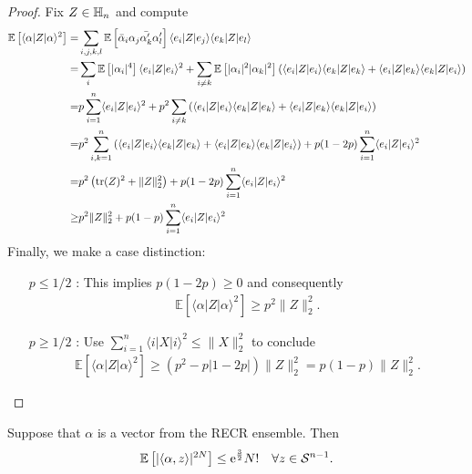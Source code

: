 \begin{proof}
Fix $ Z \in \mathbb{H}_n$ and compute
\begin{align}
  \mathbb{E} \left[ \langle \alpha |  Z | \alpha \rangle^2 \right]
  =& \sum_{i,j,k,l} \mathbb{E} \left[ \bar{\alpha}_i \alpha_j \bar{\alpha^\prime_k} \alpha^\prime_l \right] \langle  e_i| Z|  e_j \rangle \langle  e_k | Z|  e_l \rangle \\
  =& \sum_{i} \mathbb{E} \left[ | \alpha_i |^4 \right] \langle  e_i| Z| e_i \rangle^2 + \sum_{i \neq k} \mathbb{E} \left[ | \alpha_i |^2 | \alpha_k|^2 \right] \left( \langle  e_i| Z| e_i \rangle \langle  e_k| Z| e_k \rangle + \langle  e_i| Z| e_k \rangle \langle  e_k|  Z| e_i \rangle \right) \\
  =& p \sum_{i=1}^n \langle  e_i| Z| e_i \rangle^2 + p^2 \sum_{i \neq k} \left( \langle  e_i| Z| e_i \rangle \langle  e_k| Z| e_k \rangle + \langle  e_i| Z| e_k \rangle \langle  e_k | Z|  e_i\rangle \right) \\
  =& p^2 \sum_{i,k=1}^n \left( \langle  e_i| Z| e_i \rangle \langle  e_k| Z| e_k \rangle + \langle  e_i| Z| e_k \rangle \langle  e_k | Z|  e_i\rangle \right) + p(1-2 p) \sum_{i=1}^n \langle  e_i| Z| e_i \rangle^2 \\
  =& p^2 \left( \operatorname{tr} ( Z)^2 + \| Z\|_2^2 \right) + p (1-2 p) \sum_{i=1}^n \langle  e_i|  Z |  e_i \rangle^2 \\
  \geq& p^2 \| Z\|_2^2 + p(1-p) \sum_{i=1}^n \langle  e_i | Z| e_i \rangle^2
\end{align}
Finally, we make a case distinction:
\begin{itemize}
\item[$p \leq 1/2$]: This implies $p(1-2p) \geq 0$ and consequently
\begin{align}
  \mathbb{E} \left[ \langle \alpha | Z| \alpha \rangle^2 \right] \geq p^2 \|  Z \|_2^2.
\end{align}
\item[$p \geq 1/2$]: Use $\sum_{i=1}^n \langle i| X|i \rangle^2 \leq \| X \|_2^2$ to conclude
\begin{align}
  \mathbb{E} \left[ \langle \alpha |  Z | \alpha \rangle^2 \right]
\geq ( p^2 - p|1-2p|) \| Z\|_2^2 = p(1-p) \|  Z \|_2^2.
\end{align}
\end{itemize}
\end{proof}

\begin{lemma}
Suppose that $\alpha$ is a vector from the RECR ensemble. Then
\begin{align}
\mathbb{E} \left[ | \langle \alpha,  z \rangle|^{2N} \right] \leq \mathrm{e}^{\frac{3}{2}} N! \quad \forall  z \in \mathcal{S}^{n-1}.
\end{align}
\end{lemma}


